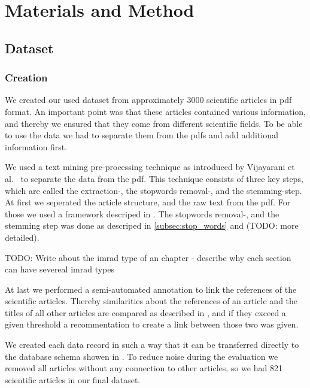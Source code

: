 \chapter{Materials and Method}
\label{cha:materials_and_method}

\section{Dataset}
\label{sec:dataset}

\subsection{Creation}
\label{subsec:creation}

We created our used dataset from approximately 3000 scientific articles in pdf format. An important point was that these articles contained various information, and thereby we ensured that they come from different scientific fields. To be able to use the data we had to separate them from the pdfs and add additional information first.

We used a text mining pre-processing technique as introduced by Vijayarani et al.~\cite{Vijayarani2015} to separate the data from the pdf. This technique consists of three key steps, which are called the extraction-, the stopwords removal-, and the stemming-step. At first we seperated the article structure, and the raw text from the pdf. For those we used a framework descriped in . The stopwords removal-, and the stemming step was done as descriped in \cref{subsec:stop_words} and  (TODO: more detailed).

TODO: Write about the imrad type of an chapter - describe why each section can have severeal imrad types

At last we performed a semi-automated annotation to link the references of the scientific articles. Thereby similarities about the references of an article and the titles of all other articles are compared as described in , and if they exceed a given threshold a recommentation to create a link between those two was given.

We created each data record in such a way that it can be transferred directly to the database schema showen in . To reduce noise during the evaluation we removed all articles without any connection to other articles, so we had 821 scientific articles in our final dataset. 

